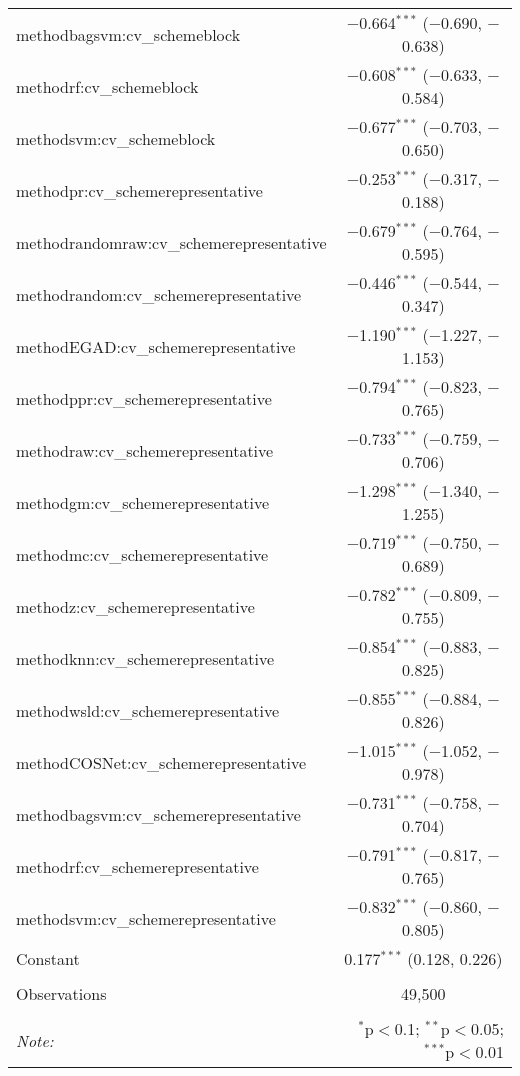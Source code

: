 \begin{table}[!htbp]
\begin{tabular}{@{\extracolsep{5pt}}lc}
  methodbagsvm:cv\_schemeblock & $-$0.664$^{***}$ ($-$0.690, $-$0.638) \\ 
  methodrf:cv\_schemeblock & $-$0.608$^{***}$ ($-$0.633, $-$0.584) \\ 
  methodsvm:cv\_schemeblock & $-$0.677$^{***}$ ($-$0.703, $-$0.650) \\ 
  methodpr:cv\_schemerepresentative & $-$0.253$^{***}$ ($-$0.317, $-$0.188) \\ 
  methodrandomraw:cv\_schemerepresentative & $-$0.679$^{***}$ ($-$0.764, $-$0.595) \\ 
  methodrandom:cv\_schemerepresentative & $-$0.446$^{***}$ ($-$0.544, $-$0.347) \\ 
  methodEGAD:cv\_schemerepresentative & $-$1.190$^{***}$ ($-$1.227, $-$1.153) \\ 
  methodppr:cv\_schemerepresentative & $-$0.794$^{***}$ ($-$0.823, $-$0.765) \\ 
  methodraw:cv\_schemerepresentative & $-$0.733$^{***}$ ($-$0.759, $-$0.706) \\ 
  methodgm:cv\_schemerepresentative & $-$1.298$^{***}$ ($-$1.340, $-$1.255) \\ 
  methodmc:cv\_schemerepresentative & $-$0.719$^{***}$ ($-$0.750, $-$0.689) \\ 
  methodz:cv\_schemerepresentative & $-$0.782$^{***}$ ($-$0.809, $-$0.755) \\ 
  methodknn:cv\_schemerepresentative & $-$0.854$^{***}$ ($-$0.883, $-$0.825) \\ 
  methodwsld:cv\_schemerepresentative & $-$0.855$^{***}$ ($-$0.884, $-$0.826) \\ 
  methodCOSNet:cv\_schemerepresentative & $-$1.015$^{***}$ ($-$1.052, $-$0.978) \\ 
  methodbagsvm:cv\_schemerepresentative & $-$0.731$^{***}$ ($-$0.758, $-$0.704) \\ 
  methodrf:cv\_schemerepresentative & $-$0.791$^{***}$ ($-$0.817, $-$0.765) \\ 
  methodsvm:cv\_schemerepresentative & $-$0.832$^{***}$ ($-$0.860, $-$0.805) \\ 
  Constant & 0.177$^{***}$ (0.128, 0.226) \\ 
 \hline \\[-1.8ex] 
Observations & 49,500 \\ 
\hline 
\hline \\[-1.8ex] 
\textit{Note:}  & \multicolumn{1}{r}{$^{*}$p$<$0.1; $^{**}$p$<$0.05; $^{***}$p$<$0.01} \\ 
\end{tabular} 
\end{table} 
